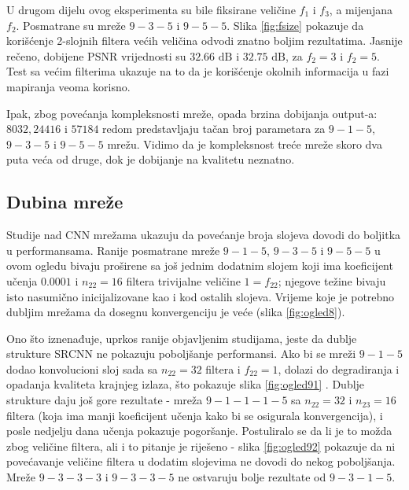 \documentclass[12pt]{report}
\numberwithin{equation}{section}
\begin{document}
  U drugom dijelu ovog eksperimenta su bile fiksirane veličine $f_1$ i $f_3$, a mijenjana $f_2$. Posmatrane su mreže $9-3-5$ i $9-5-5$. Slika \ref{fig:fsize} pokazuje da korišćenje 2-slojnih filtera većih veličina odvodi znatno boljim rezultatima. Jasnije rečeno, dobijene PSNR vrijednosti su $32.66\text{ dB}$ i $32.75\text{ dB}$, za $f_2=3$ i $f_2=5$. Test sa većim filterima ukazuje na to da je korišćenje okolnih informacija u fazi mapiranja veoma korisno. 
 
Ipak, zbog povećanja kompleksnosti mreže, opada brzina dobijanja output-a: $8032, 24416$ i $57184$ redom predstavljaju tačan broj parametara za $9-1-5$, $9-3-5$ i $9-5-5$ mrežu. Vidimo da je kompleksnost treće mreže skoro dva puta veća od druge, dok je dobijanje na kvalitetu neznatno.   

  \subsection{Dubina mreže}
   
   Studije nad CNN mrežama ukazuju da povećanje broja slojeva dovodi do boljitka u performansama. Ranije posmatrane mreže $9-1-5$, $9-3-5$ i $9-5-5$ u ovom ogledu bivaju proširene sa još jednim dodatnim slojem koji ima koeficijent učenja $0.0001$ i $n_{22}=16$ filtera trivijalne veličine $1=f_{22}$; njegove težine bivaju isto nasumično inicijalizovane kao i kod ostalih slojeva. Vrijeme koje je potrebno dubljim mrežama da dosegnu konvergenciju je veće (slika \ref{fig:ogled8}). 
   
    Ono što iznenađuje, uprkos ranije objavljenim studijama, jeste da dublje strukture SRCNN ne pokazuju poboljšanje performansi. Ako bi se mreži $9-1-5$ dodao konvolucioni sloj sada sa $n_{22} = 32$ filtera i $f_{22}=1$, dolazi do degradiranja i opadanja kvaliteta krajnjeg izlaza, što pokazuje slika \ref{fig:ogled91} . Dublje strukture daju još gore rezultate - mreža $9-1-1-1-5$ sa $n_{22} = 32$ i $n_{23} = 16$ filtera (koja ima manji koeficijent učenja kako bi se osigurala konvergencija), i posle nedjelju dana učenja pokazuje pogoršanje. Postuliralo se da li je to možda zbog veličine filtera, ali i to pitanje je riješeno - slika \ref{fig:ogled92} pokazuje da ni povećavanje veličine filtera u dodatim slojevima ne dovodi do nekog poboljšanja. Mreže $9-3-3-3$ i $9-3-3-5$ ne ostvaruju bolje rezultate od $9-3-1-5$.  
      
\end{document}
